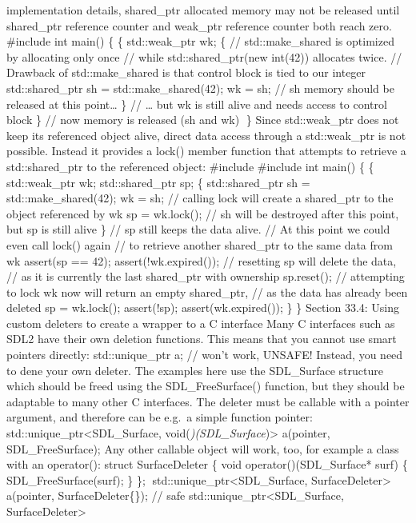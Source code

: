 {implementation details, shared\_ptr allocated memory may not be released
until shared\_ptr reference counter and weak\_ptr reference counter both
reach zero. \#include int main() \{ \{ std::weak\_ptr wk; \{ //
std::make\_shared is optimized by allocating only once // while
std::shared\_ptr(new int(42)) allocates twice. // Drawback of
std::make\_shared is that control block is tied to our integer
std::shared\_ptr sh = std::make\_shared(42); wk = sh; // sh memory
should be released at this point\ldots{} \} // \ldots{} but wk is still
alive and needs access to control block \} // now memory is released (sh
and wk) \} Since std::weak\_ptr does not keep its referenced object
alive, direct data access through a std::weak\_ptr is not possible.
Instead it provides a lock() member function that attempts to retrieve a
std::shared\_ptr to the referenced object: \#include \#include int
main() \{ \{ std::weak\_ptr wk; std::shared\_ptr sp; \{ std::shared\_ptr
sh = std::make\_shared(42); wk = sh; // calling lock will create a
shared\_ptr to the object referenced by wk sp = wk.lock(); // sh will be
destroyed after this point, but sp is still alive \} // sp still keeps
the data alive. // At this point we could even call lock() again // to
retrieve another shared\_ptr to the same data from wk assert(}sp == 42);
assert(!wk.expired()); // resetting sp will delete the data, // as it is
currently the last shared\_ptr with ownership sp.reset(); // attempting
to lock wk now will return an empty shared\_ptr, // as the data has
already been deleted sp = wk.lock(); assert(!sp); assert(wk.expired());
\} \} Section 33.4: Using custom deleters to create a wrapper to a C
interface Many C interfaces such as SDL2 have their own deletion
functions. This means that you cannot use smart pointers directly:
std::unique\_ptr a; // won't work, UNSAFE! Instead, you need to dene
your own deleter. The examples here use the SDL\_Surface structure which
should be freed using the SDL\_FreeSurface() function, but they should
be adaptable to many other C interfaces. The deleter must be callable
with a pointer argument, and therefore can be e.g.~a simple function
pointer: std::unique\_ptr\textless SDL\_Surface,
void(\emph{)(SDL\_Surface})\textgreater{} a(pointer, SDL\_FreeSurface);
Any other callable object will work, too, for example a class with an
operator(): struct SurfaceDeleter \{ void operator()(SDL\_Surface* surf)
\{ SDL\_FreeSurface(surf); \} \};
std::unique\_ptr\textless SDL\_Surface, SurfaceDeleter\textgreater{}
a(pointer, SurfaceDeleter\{\}); // safe
std::unique\_ptr\textless SDL\_Surface, SurfaceDeleter\textgreater{}
